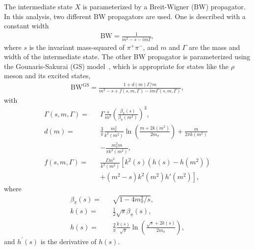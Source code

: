 \documentclass[twocolumn,showpacs,aps,prd]{revtex4-1}
\begin{document}
The intermediate state $X$ is parameterized by a Breit-Wigner (BW) propagator. In this analysis, two different BW
propagators are used. One is described with a constant width
%
\begin{eqnarray}
  \label{BW}
  \mathrm{BW} = \frac{1}{m^2 - s - im\Gamma},
\end{eqnarray}
%
where $s$ is the invariant mass-squared of $\pi^+\pi^-$, and $m$ and $\Gamma$ are the mass and width of the intermediate state.
The other BW propagator is parameterized using the Gounaris-Sakurai (GS) model~\cite{GS1,GS2}, which is appropriate for states like the $\rho$ meson and its excited states,
%
\begin{eqnarray}
  \label{BW-GS}
  \mathrm{BW^{GS}} = \frac{1 + d(m)\Gamma/m}{m^2 - s + f(s, m, \Gamma) - im\Gamma(s, m, \Gamma)},
\end{eqnarray}
%
with
%
\begin{eqnarray}
  \Gamma(s, m, \Gamma) =&& \Gamma \frac{s}{m^2}\left(\frac{\beta_\pi(s)}{\beta_\pi(m^2)}\right)^3, \nonumber\\
                  d(m) =&& \frac{3}{\pi} \frac{m^2_\pi}{k^2(m^2)} \ln\left(\frac{m + 2k(m^2)}{2m_\pi}\right) + \frac{m}{2\pi k(m^2)}  \nonumber\\
                        &&- \frac{m^2_\pi m}{\pi k^3(m^2)}, \\
       f(s, m, \Gamma) =&& \frac{\Gamma m^2}{k^3(m^2)}\left[k^2(s)(h(s) - h(m^2))\right. \nonumber \\
                        &&+\left. (m^2 - s)k^2(m^2)h'(m^2)\right], \nonumber
\end{eqnarray}
%
where
%
\begin{eqnarray}
    \beta_\pi(s) =&& \sqrt{1 - 4m_\pi^2/s}, \nonumber\\
             k(s)=&& \frac{1}{2} \sqrt{s} \beta_\pi(s), \\
             h(s)=&& \frac{2}{\pi} \frac{k(s)}{\sqrt{s}}\ln\left(\frac{\sqrt{s} + 2k(s)}{2m_\pi}\right), \nonumber
\end{eqnarray}
%
and $h^\prime(s)$ is the derivative of $h(s)$.
\end{document}
